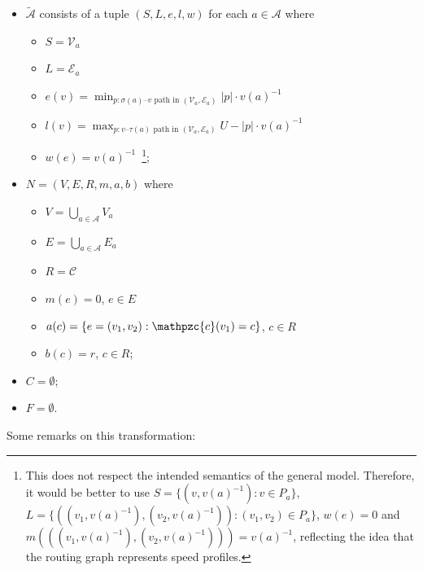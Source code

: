\documentclass{article}
\begin{document}
\begin{itemize}
    \item $\tilde{\mathcal{A}}$ consists of a tuple $(S,L,e,l,w)$ for each $a \in \mathcal{A}$ where
        \begin{itemize}
            \item $S=\mathcal{V}_a$
            \item $L=\mathcal{E}_a$
            \item $e(v)=\min_{p: \sigma(a)\textrm{--}v\textrm{ path in }(\mathcal{V}_a,\mathcal{E}_a)} \left|p\right| \cdot {v(a)}^{-1}$
            \item $l(v)=\max_{p: v\textrm{--}\tau(a)\textrm{ path in }(\mathcal{V}_a,\mathcal{E}_a)} U-\left|p\right| \cdot {v(a)}^{-1}$
            \item $w(e)={v(a)}^{-1}$\mbox{  }\footnote{This does not respect the intended semantics of the general model. Therefore, it would be better to use $S=\{ (v,{v(a)}^{-1}): v \in P_a\}$, $L=\{ ((v_1,{v(a)}^{-1}),(v_2,{v(a)}^{-1})): (v_1,v_2) \in P_a\}$, $w(e)=0$ and $m(((v_1,{v(a)}^{-1}),(v_2,{v(a)}^{-1})))={v(a)}^{-1}$, reflecting the idea that the routing graph represents speed profiles.};
        \end{itemize}
        \item $N=(V,E,R,m,a,b)$ where
        \begin{itemize}
            \item $V=\bigcup_{a \in \mathcal{A}} V_a$
            \item $E=\bigcup_{a \in \mathcal{A}} E_a$
            \item $R=\mathcal{C}$
            \item $m(e)=0$, $e \in E$
            \item $a(c) = \left\{ e=(v_1,v_2): \mathpzc{c}(v_1)=c \right\}$, $c\in R$
            \item $b(c)=r$, $c\in R$;
        \end{itemize}
    \item $C=\emptyset$;
    \item $F=\emptyset$.
\end{itemize}
Some remarks on this transformation:
\end{document}
